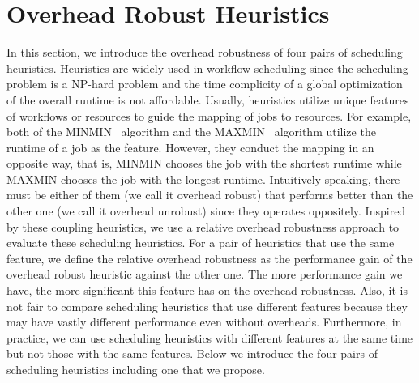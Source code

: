 \documentclass[final,5p,times,twocolumn]{elsarticle}
\begin{document}
\section{Overhead Robust Heuristics}
\label{sec:heuristics}
In this section, we introduce the overhead robustness of four pairs of scheduling heuristics. Heuristics are widely used in workflow scheduling since the scheduling problem is a NP-hard problem and the time complicity of a global optimization of the overall runtime is not affordable. Usually, heuristics utilize unique features of workflows or resources to guide the mapping of jobs to resources. For example, both of the MINMIN~\cite{Blythe2005} algorithm and the MAXMIN~\cite{Braun2001} algorithm utilize the runtime of a job as the feature. However, they conduct the mapping in an opposite way, that is, MINMIN chooses the job with the shortest runtime while MAXMIN chooses the job with the longest runtime. Intuitively speaking, there must be either of them (we call it overhead robust) that performs better than the other one (we call it overhead unrobust) since they operates oppositely. Inspired by these coupling heuristics, we use a relative overhead robustness approach to evaluate these scheduling heuristics. For a pair of heuristics that use the same feature, we define the relative overhead robustness as the performance gain of the overhead robust heuristic against the other one. The more performance gain we have, the more significant this feature has on the overhead robustness. Also, it is not fair to compare scheduling heuristics that use different features because they may have vastly different performance even without overheads. Furthermore, in practice, we can use scheduling heuristics with different features at the same time but not those with the same features. 
Below we introduce the four pairs of scheduling heuristics including one that we propose. 

\end{document}
